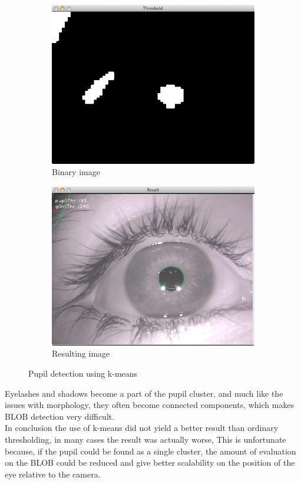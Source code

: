 \documentclass[a4paper,11pt]{article}
\begin{document}
\begin{figure}[H]
\centering
\begin{subfigure}{.5\textwidth}
  \centering
  \includegraphics[width=.8\linewidth]{kmean_bin}
  \caption{Binary image}
  \label{fig:kmeans_binary}
\end{subfigure}%
\begin{subfigure}{.5\textwidth}
  \centering
  \includegraphics[width=.8\linewidth]{kmean_result}
  \caption{Resulting image}
  \label{fig:kmeans_result}
\end{subfigure}
\caption{Pupil detection using k-means}
\label{fig:kmeans}
\end{figure}

Eyelashes and shadows become a part of the pupil cluster, and much like the issues with morphology, they often become connected components, which makes BLOB detection very difficult.\\

In conclusion the use of k-means did not yield a better result than ordinary thresholding, in many cases the result was actually worse, This is unfortunate because, if the pupil could be found as a single cluster, the amount of evaluation on the BLOB could be reduced and give better scalability on the position of the eye relative to the camera.
\end{document}
